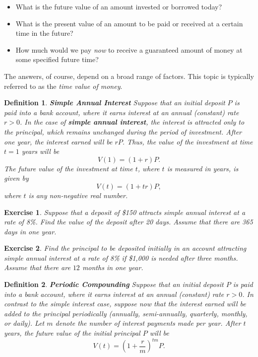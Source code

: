 \documentclass[letterpaper,10pt]{article}
\newtheorem{df}{Definition}[section]
\newtheorem{ex}{Exercise}
\begin{document}
\begin{itemize}

\item What is the future value of an amount invested or borrowed today?

\item What is the present value of an amount to be paid or received at a certain time in the future?

\item How much would we pay {\em now} to receive a guaranteed amount of money at some specified future time?

\end{itemize}

The answers, of course, depend on a broad range of factors.  This topic is typically referred to as the {\em time value of money}.

\begin{df}{\bf Simple Annual Interest}
Suppose that an initial deposit $P$ is paid into a bank account, where it earns interest at an annual (constant) rate $r>0$.  In the case of {\bf simple annual interest}, the interest is attracted only to the principal, which remains unchanged during the period of investment.  After one year, the interest earned will be $rP$.  Thus, the value of the investment at time $t=1$ years will be $$V(1)=(1+r)P.$$  The {\em future value} of the investment at time $t$, where $t$ is measured in years, is given by $$V(t)=(1+tr)P,$$ where $t$ is any non-negative real number.
\end{df}

\begin{ex}
Suppose that a deposit of \$150 attracts simple annual interest at a rate of 8\%.  Find the value of the deposit after 20 days.  Assume that there are 365 days in one year.  
\end{ex}

\begin{ex}
Find the principal to be deposited initially in an account attracting simple annual interest at a rate of 8\% if \$1,000 is needed after three months.  Assume that there are $12$ months in one year.
\end{ex}




\begin{df}{\bf Periodic Compounding}
Suppose that an initial deposit $P$ is paid into a bank account, where it earns interest at an annual (constant) rate $r>0$.  In contrast to the simple interest case, suppose now that the interest earned will be added to the principal periodically (annually, semi-annually, quarterly, monthly, or daily).  Let $m$ denote the number of interest payments made per year.  After $t$ years, the {\em future value} of the initial principal $P$ will be $$V(t)=\left(1+\frac{r}{m}\right)^{tm}P.$$  
\end{df}
\end{document}
